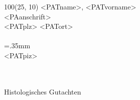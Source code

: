 \documentclass{scrreprt}
\begin{document}
%
 


\baselineskip10pt

\textblockorigin{0in}{0in}
\setlength{\TPHorizModule}{1mm}
\setlength{\TPVertModule}{1mm}


{
\footnotesize
\begin{textblock}{100}(25, 10) 
\noindent <PATname>, <PATvorname>\\
<PAanschrift>\\
<PATplz> <PATort>\\\\
\X=.35mm        %
\barheight=1cm %
\\
<PATpiz>\\
\end{textblock}
}

~\\
\vspace{5.0cm}\\
{\huge Histologisches Gutachten} 
\end{document}

